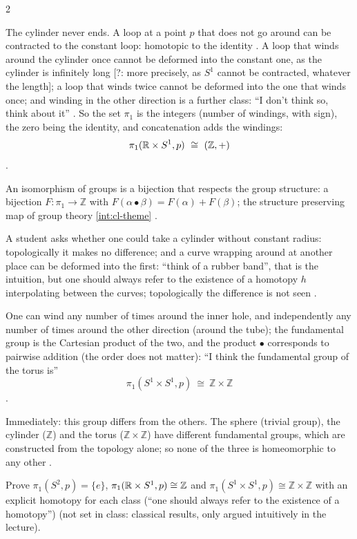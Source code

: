 \begin{paracol}{2}
\begin{example}\label{ex:iv-cyl}
The cylinder never ends. A loop at a point $p$ that does not go around can be contracted to the constant loop: homotopic to the identity . A loop that winds around the cylinder once cannot be deformed
into the constant one, as the cylinder is infinitely long [?: more precisely, as $S^1$ cannot be contracted, whatever the length]; a loop that winds twice cannot be deformed into the one that winds once; and winding in the other direction
is a further class: ``I don't think so, think about it'' . So the set $\pi_1$ is the integers (number of windings, with sign), the zero being the identity, and
concatenation adds the windings:
\[
  \pi_1(\mathbb{R}\times S^1,p)\ \cong\ (\mathbb Z,+)
\]
.
\end{example}
\begin{recall}
An isomorphism of groups is a bijection that respects the group structure: a bijection $F\colon\pi_1\to\mathbb Z$ with $F(\alpha\bullet\beta)=F(\alpha)+F(\beta)$; the structure preserving map of
group theory \cref{int:cl-theme} .
\end{recall}
A student asks whether one could take a cylinder without constant radius: topologically it makes no difference; and a curve wrapping around at another place can be deformed into the first: ``think of a rubber band'', that is the intuition, but one should
always refer to the existence of a homotopy $h$ interpolating between the curves; topologically the difference is not seen .

\begin{example}\label{ex:iv-torus}
One can wind any number of times around the inner hole, and independently any number of times around the other direction (around the tube); the fundamental group is the Cartesian product of the two, and the product $\bullet$ corresponds to
pairwise addition (the order does not matter): ``I think the fundamental group of the torus is''
\[
  \pi_1(S^1\times S^1,p)\ \cong\ \mathbb Z\times\mathbb Z
\]
.
\end{example}
Immediately: this group differs from the others. The sphere (trivial group), the cylinder ($\mathbb Z$) and the torus ($\mathbb Z\times\mathbb Z$) have different fundamental groups, which are constructed from the topology alone; so none of the three is homeomorphic to any other
.
\begin{exercise}\label{ex:iv-pi1-ex}
Prove $\pi_1(S^2,p)=\{e\}$, $\pi_1(\mathbb{R}\times S^1,p)\cong\mathbb Z$ and $\pi_1(S^1\times S^1,p)\cong\mathbb Z\times\mathbb Z$ with an explicit homotopy for each class (``one should always refer to the existence of a homotopy'')
(not set in class: classical results, only argued intuitively in the lecture).
\end{exercise}


\end{paracol}

